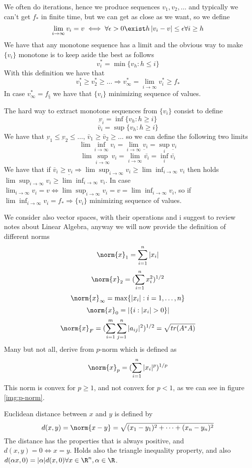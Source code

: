 We often do iterations, hence we produce sequences $v_1, v_2, \dots$ and typically we can't get 
$f_*$ in finite time, but we can get as close as we want, so we define 
\[ \lim _{i \to \infty} v_i = v \iff \forall \epsilon > 0 \exist h \, |v_i - v| \leq \epsilon 
                                     \forall i \geq h \]
We have that any monotone sequence has a limit and the obvious way to make $\{v_i\}$ monotone is 
to keep aside the best as follows
\[ v_i^* = \min \{v_h : h \leq i \} \]
With this definition we have that 
\[v_1^* \geq v_2^* \geq \dots \Rightarrow v^*_{\infty} = \lim _{i \to \infty} v^*_i \geq f_* \]
In case $v^*_{\infty} = f_§$ we have that $\{ v_i \}$ minimizing sequence of values.

The hard way to extract monotone sequences from $\{v_i\}$ consist to define 
\[ \underbar{v}_i = \inf \{v_h : h \geq i\} \]
\[ \bar{v}_i = \sup \{v_h : h \geq i \} \]
We have that $\underbar{v}_1 \leq \underbar{v}_2 \leq \dots, \, \bar{v}_1 \geq \bar{v}_2 \geq \dots$
so we can define the following two limits
\[ \lim \inf _{i \to \infty} v_i = \lim _{i \to \infty} \underbar{v_i} = \sup_i \underbar{v_i} \]
\[ \lim \sup _{i \to \infty} v_i = \lim _{i \to \infty} \bar{v_i} = \inf_i \bar{v_i} \]
We have that if $\bar{v}_i \geq \underbar{v_i} \Rightarrow \lim \sup_{i \to \infty} v_i \geq
                                                           \lim \inf_{i \to \infty} v_i$
then holds $\lim \sup _{i \to \infty} v_i \geq \lim \inf _{i \to \infty} v_i$.\newline
In case $\lim _{i \to \infty} v_i = v \iff \lim \sup _{i \to \infty} v_i = v = 
                                           \lim \inf _{i \to \infty} v_i$, so if 
$\lim \inf _{i \to \infty} v_i = f_* \Rightarrow \{v_i\}$ minimizing sequence of values.

We consider also vector spaces, with their operations and i suggest to review notes about Linear 
Algebra, anyway we will now provide the definition of different norms
\[ \norm{x}_1 = \sum _{i = 1}^n |x_i| \]
\[ \norm{x}_2 = (\sum _{i = 1}^n x_i^2)^{1/2} \]
\[ \norm{x}_{\infty} = \max \{|x_i| : i = 1, \dots, n\} \]
\[ \norm{x}_0 = |\{i : |x_i| > 0\}| \]
\[ \norm{x}_F = (\sum _{i=1}^m \sum _{j=1}^n |a_{ij}|^2)^{1/2} = \sqrt{tr(A^*A)} \]
Many but not all, derive from $p$-norm which is defined as 
\[ \norm{x}_p = (\sum _{i=1}^n |x_i|^p)^{1/p} \]
This norm is convex for $p \geq 1$, and not convex for $p < 1$, as we can see in figure 
\ref{img:p-norm}.

Euclidean distance between $x$ and $y$ is defined by 
\[ d(x, y) = \norm{x - y} = \sqrt{(x_1 - y_1)^2 + \dots + (x_n - y_n)^2} \]
The distance has the properties that is always positive, and $d(x, y) = 0 \iff x = y$.\newline
Holds also the triangle inequality property, and also $d(\alpha x, 0) = |\alpha| d(x, 0) 
\forall x \in \R^n, \alpha \in \R$.

